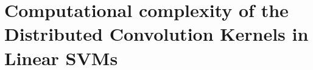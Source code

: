 \documentclass[twoside,11pt]{article}
\def\vec#1{\mathbf{#1}}
\def\shufprod{\otimes}
\def\shufcconv{\circledast}
\newcounter{properties}
\def\comment#1#2{}
\def\mysecondremove#1{}
\def\mysecondinsert#1{#1}
\begin{document}
%
%
%
%
%
%
%
%


\section{Computational complexity of the Distributed Convolution Kernels in Linear SVMs\comment{NEW}{}}
\label{sec:complexity}
\end{document}

